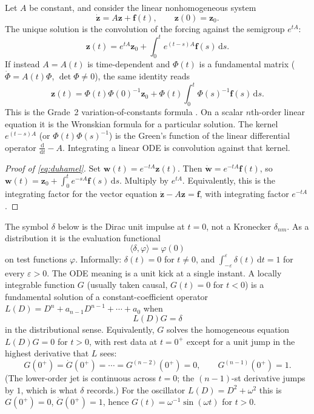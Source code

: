 \documentclass[11pt,a4paper]{article}
\begin{document}
\begin{theorem}
\label{thm:duhamel}
Let \(A\) be constant, and consider the linear nonhomogeneous system
\[
\dot{\mathbf{z}}
=
A\mathbf{z}+\mathbf{f}(t),
\qquad
\mathbf{z}(0)=\mathbf{z}_0.
\]
The unique solution is the convolution of the forcing against the semigroup \(e^{tA}\):
\begin{equation}
\label{eq:duhamel}
\mathbf{z}(t)
=
e^{tA}\mathbf{z}_0
+
\int_{0}^{t} e^{(t-s)A}\mathbf{f}(s)\,\mathrm{d}s.
\end{equation}
If instead \(A=A(t)\) is time-dependent and \(\Phi(t)\) is a fundamental matrix (\(\dot\Phi=A(t)\Phi\), \(\det\Phi\neq 0\)), the same identity reads
\[
\mathbf{z}(t)
=
\Phi(t)\Phi(0)^{-1}\mathbf{z}_0
+
\Phi(t)\int_{0}^{t}\Phi(s)^{-1}\mathbf{f}(s)\,\mathrm{d}s.
\]
This is the Grade~2 variation-of-constants formula \cite{grade2ode}. On a scalar \(n\)th-order linear equation it is the Wronskian formula for a particular solution. The kernel \(e^{(t-s)A}\) (or \(\Phi(t)\Phi(s)^{-1}\)) is the Green's function of the linear differential operator \(\frac{\mathrm{d}}{\mathrm{d}t}-A\). Integrating a linear ODE is convolution against that kernel.
\end{theorem}

\begin{proof}[Proof of \eqref{eq:duhamel}]
Set \(\mathbf{w}(t)=e^{-tA}\mathbf{z}(t)\). Then \(\dot{\mathbf{w}}=e^{-tA}\mathbf{f}(t)\), so \(\mathbf{w}(t)=\mathbf{z}_0+\int_0^t e^{-sA}\mathbf{f}(s)\,\mathrm{d}s\). Multiply by \(e^{tA}\). Equivalently, this is the integrating factor for the vector equation \(\dot{\mathbf{z}}-A\mathbf{z}=\mathbf{f}\), with integrating factor \(e^{-tA}\).
\end{proof}

\begin{definition}
\label{def:dirac}
The symbol \(\delta\) below is the Dirac unit impulse at \(t=0\), not a Kronecker \(\delta_{nm}\). As a distribution it is the evaluation functional
\[
\langle\delta,\varphi\rangle=\varphi(0)
\]
on test functions \(\varphi\). Informally: \(\delta(t)=0\) for \(t\neq 0\), and \(\int_{-\varepsilon}^{\varepsilon}\delta(t)\,\mathrm{d}t=1\) for every \(\varepsilon>0\). The ODE meaning is a unit kick at a single instant. A locally integrable function \(G\) (usually taken causal, \(G(t)=0\) for \(t<0\)) is a fundamental solution of a constant-coefficient operator \(L(D)=D^{n}+a_{n-1}D^{n-1}+\cdots+a_{0}\) when
\[
L(D)G=\delta
\]
in the distributional sense. Equivalently, \(G\) solves the homogeneous equation \(L(D)G=0\) for \(t>0\), with rest data at \(t=0^{+}\) except for a unit jump in the highest derivative that \(L\) sees:
\[
G(0^{+})=\dot G(0^{+})=\cdots=G^{(n-2)}(0^{+})=0,
\qquad
G^{(n-1)}(0^{+})=1.
\]
(The lower-order jet is continuous across \(t=0\); the \((n-1)\)-st derivative jumps by \(1\), which is what \(\delta\) records.) For the oscillator \(L(D)=D^{2}+\omega^{2}\) this is \(G(0^{+})=0\), \(\dot G(0^{+})=1\), hence \(G(t)=\omega^{-1}\sin(\omega t)\) for \(t>0\).
\end{definition}
\end{document}
